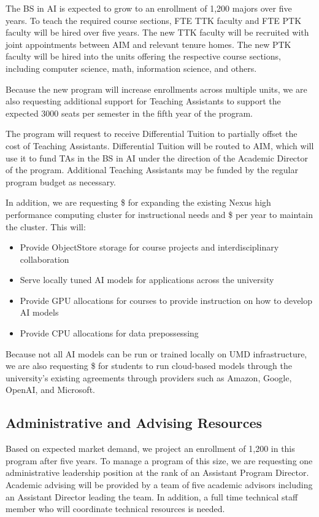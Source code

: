 {The BS in AI is expected to grow to an enrollment of 1,200 majors over five years. To teach the required course sections, FTE TTK faculty and FTE PTK faculty will be hired over five years. The new TTK faculty will be recruited with joint appointments between AIM and relevant tenure homes. The new PTK faculty will be hired into the units offering the respective course sections, including computer science, math, information science, and others.

Because the new program will increase enrollments across multiple units, we are also requesting additional support for Teaching Assistants to support the expected 3000 seats per semester in the fifth year of the program.

The program will request to receive Differential Tuition to partially offset the cost of Teaching Assistants. Differential Tuition will be routed to AIM, which will use it to fund TAs in the BS in AI under the direction of the Academic Director of the program. Additional Teaching Assistants may be funded by the regular program budget as necessary.

In addition, we are requesting \$\upfrontcluster{} for expanding the existing Nexus high performance computing cluster for instructional needs and \$\continuingcluster{} per year to maintain the cluster.  This will:
\begin{itemize}
    \item Provide ObjectStore storage for course projects and interdisciplinary collaboration
    \item Serve locally tuned AI models for applications across the university
    \item Provide GPU allocations for courses to provide instruction on how to develop AI models
    \item Provide CPU allocations for data prepossessing
\end{itemize}

Because not all AI models can be run or trained locally on UMD infrastructure, we are also requesting \$\cloud{} for students to run cloud-based models through the university's existing agreements through providers such as Amazon, Google, OpenAI, and Microsoft.

\subsection{Administrative and Advising Resources}

Based on expected market demand, we project an enrollment of 1,200 in this program after five years. To manage a program of this size, we are requesting one administrative leadership position at the rank of an Assistant Program Director. Academic advising will be provided by a team of five academic advisors including an Assistant Director leading the team. In addition, a full time technical staff member who will coordinate technical resources is needed. 

}
